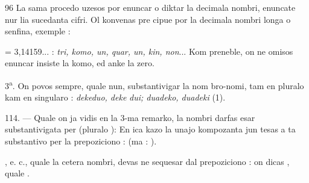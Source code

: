 \begin{VUpage}[100]{96}
La sama procedo uzesos por enuncar o diktar la decimala\nl
nombri, enuncate nur lia sucedanta cifri. Ol konvenas pre\cc
cipue por la decimala nombri longa o senfina, exemple :

= 3,14159... : \textit{tri, komo, un, quar, un, kin, non}... Kom\cc
preneble, on ne omisos enuncar insiste la komo, ed anke\nl
la zero.

3\textsuperscript{a}. On povos sempre, quale nun, substantivigar la nom\cc
bro-nomi, tam en pluralo kam en singularo : \textit{dekeduo, deke}\cc
\textit{dui; duadeko, duadeki} (1).

\VUblanc{4.82pt}%
114. --- Quale on ja vidis en la 3-ma remarko, la nombri\nl
darfas esar substantivigata per  (pluralo ): \nl
{} En ica kazo la unajo kompozanta jun\cc
tesas a ta substantivo per la prepoziciono  : \nl
{} (ma : ).

, e. c., quale la cetera nombri, devas\nl
ne sequesar dal prepoziciono  : on dicas \nl
{}, quale .
\end{VUpage}

